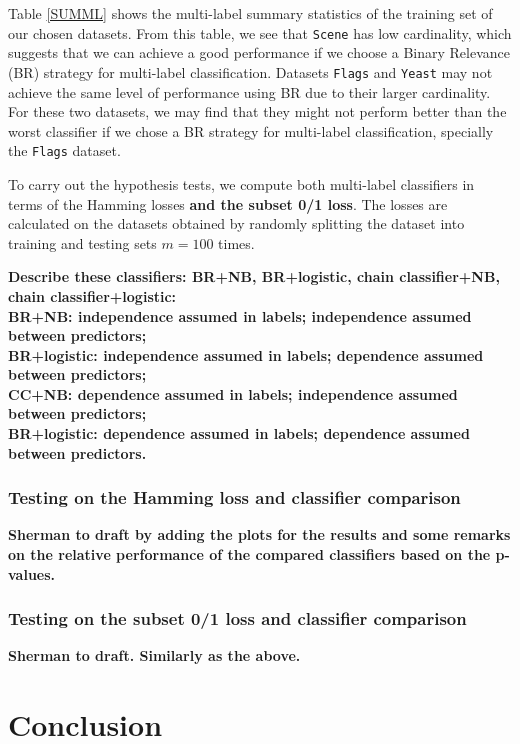 \documentclass[review]{elsarticle}
\begin{document}
Table \ref{SUMML} shows the multi-label summary statistics of the training set of our chosen datasets. From this table, we see that \texttt{Scene} has low cardinality, which suggests that we can achieve a good performance if we choose a Binary Relevance (BR) strategy for multi-label classification. Datasets \texttt{Flags} and \texttt{Yeast} may not achieve the same level of performance using BR due to their larger cardinality. For these two datasets, we may find that they might not perform better than the worst classifier if we chose a BR strategy for multi-label classification, specially the \texttt{Flags} dataset.

To carry out the hypothesis tests, we compute both multi-label classifiers in terms of the Hamming losses {\bf and the subset 0/1 loss}. The losses are calculated on the datasets obtained by randomly splitting the dataset into training and testing sets $m = 100$ times. 

{\bf Describe these classifiers: BR+NB, BR+logistic, chain classifier+NB, chain classifier+logistic:\\
BR+NB: independence assumed in labels; independence assumed between predictors;\\
BR+logistic: independence assumed in labels; dependence assumed between predictors;\\
CC+NB: dependence assumed in labels; independence assumed between predictors;\\
BR+logistic: dependence assumed in labels; dependence assumed between predictors.}



\subsubsection{Testing on the Hamming loss and classifier comparison}\label{sss:Hamming}

{\bf Sherman to draft by adding the plots for the results and some remarks on the relative performance of the compared classifiers based on the p-values.}


\subsubsection{Testing on the subset 0/1 loss  and classifier comparison}\label{sss:01}

{\bf Sherman to draft. Similarly as the above.}




\section{Conclusion}
\end{document}
